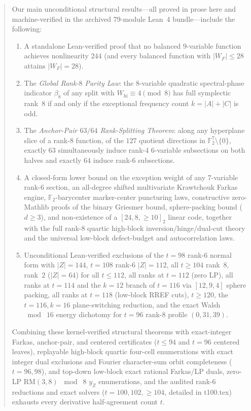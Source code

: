 \documentclass[11pt]{article}
\theoremstyle{definition}
\newcommand{\F}{\mathbb{F}}
\newcommand{\code}[1]{{\ttfamily\small\renewcommand{\_}{\textunderscore\allowbreak}#1}}
\begin{document}
\begin{abstract}
Our main unconditional structural results---all proved in prose here and machine-verified in the archived 79-module Lean~4 bundle---include the following:
\begin{enumerate}[nosep]
  \item A standalone Lean-verified proof that no balanced $9$-variable function achieves nonlinearity $244$ (and every balanced function with $|W_F|\le 28$ attains $|W_F|=28$).
  \item The \emph{Global Rank-$8$ Parity Law}: the $8$-variable quadratic spectral-phase indicator $\beta_8$ of any split with $W_{\mathrm{hi}} \equiv 4 \pmod 8$ has full symplectic rank~$8$ if and only if the exceptional frequency count $k = |A| + |C|$ is odd.
  \item The \emph{Anchor-Pair $63/64$ Rank-Splitting Theorem}: along any hyperplane slice of a rank-$8$ function, of the $127$ quotient directions in $\F_2^7 \setminus \{0\}$, exactly $63$ simultaneously induce rank-$4$ $6$-variable subsections on both halves and exactly $64$ induce rank-$6$ subsections.
  \item A closed-form lower bound on the exception weight of any $7$-variable rank-$6$ section, an all-degree shifted multivariate Krawtchouk Farkas engine, $\F_2$-barycenter marker-center puncturing laws, constructive zero-Mathlib proofs of the binary Griesmer bound, sphere-packing bound ($d \ge 3$), and non-existence of a $[24,8,\ge 10]_2$ linear code, together with the full rank-$8$ quartic high-block inversion/hinge/dual-cut theory and the universal low-block defect-budget and autocorrelation laws.
  \item Unconditional Lean-verified exclusions of the $t = 98$ rank-$6$ normal form with $|Z| = 144$, $t = 108$ rank-$6$ $|Z| = 112$, all $t \ge 104$ rank~$8$, rank~$2$ ($|Z| = 64$) for all $t \le 112$, all ranks at $t = 112$ (zero LP), all ranks at $t = 114$ and the $k = 12$ branch of $t = 116$ via $[12,9,4]$ sphere packing, all ranks at $t = 118$ (low-block RREF cuts), $t \ge 120$, the $t = 116, k = 16$ plane-switching reduction, and the exact Walsh $\bmod\;16$ energy dichotomy for $t = 96$ rank-$8$ profile $(0,31,39)$.
\end{enumerate}
Combining these kernel-verified structural theorems with exact-integer Farkas, anchor-pair, and centered certificates ($t \le 94$ and $t = 96$ centered leaves), replayable high-block quartic four-cell enumerations with exact integer dual exclusions and Fourier character-sum orbit completeness ($t = 96, 98$), and top-down low-block exact rational Farkas/LP duals, zero-LP $\mathrm{RM}(3,8)$ $\bmod\;8$ $y_Z$ enumerations, and the audited rank-$6$ reductions and exact solvers ($t = 100, 102, \ge 104$, detailed in \code{t100.tex}) exhausts every derivative half-agreement count $t$.

\end{abstract}
\end{document}
